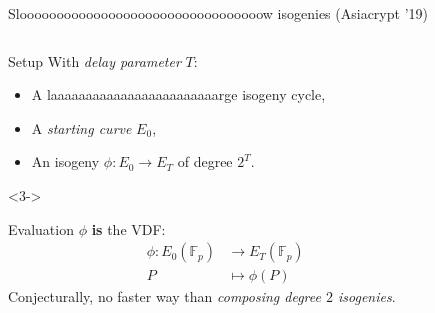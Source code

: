 \documentclass[aspectratio=169]{beamer}
\newcommand{\F}{\mathbb{F}}
\begin{document}

\begin{frame}{Slooooooooooooooooooooooooooooooooow isogenies (Asiacrypt '19)}
  \begin{columns}
    \begin{column}{0.6\textwidth}
      \begin{block}{Setup}
        With \emph{delay parameter} $T$:
        \begin{itemize}
        \item A laaaaaaaaaaaaaaaaaaaaaaaarge isogeny cycle,
        \item<2-> A \emph{starting curve} $E_0$,
        \item<2-> An isogeny \emph{$\phi:E_0\to E_T$} of degree \emph{$2^T$}.
        \end{itemize}
      \end{block}

      \begin{uncoverenv}<3->
        \begin{block}{Evaluation}
          $\phi$ \textbf{is} the VDF:
          \begin{align*}
            \phi:E_0(\F_p) &\longrightarrow E_T(\F_p)\\
            P &\longmapsto \phi(P)
          \end{align*}
          Conjecturally, no faster way than \emph{composing degree $2$
            isogenies}.
        \end{block}
      \end{uncoverenv}
    \end{column}
    \begin{column}{0.37\textwidth}
      \centering
    \end{column}
  \end{columns}
\end{frame}
\end{document}
